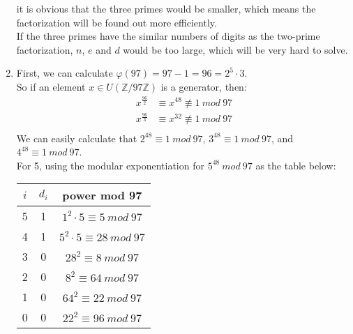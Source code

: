 \documentclass[12pt, a4paper]{article}
\begin{document}
\begin{enumerate}
          it is obvious that the three primes would be smaller, which means the factorization will be 
          found out more efficiently.\\
          If the three primes have the similar numbers of digits as the two-prime factorization, 
          $n$, $e$ and $d$ would be too large, which will be very hard to solve.
    \item First, we can calculate $\varphi(97) = 97 - 1 = 96 = 2^5\cdot 3$.\\
          So if an element $x \in U(\mathbb{Z}/97\mathbb{Z})$ is a generator, then:
          \begin{align*}
              x^{\frac{96}{2}} &\equiv x^{48} \not\equiv 1\ mod\ 97\\
              x^{\frac{96}{3}} &\equiv x^{32} \not\equiv 1\ mod\ 97\\
          \end{align*}
          We can easily calculate that $2^{48} \equiv 1\ mod\ 97$, $3^{48} \equiv 1\ mod\ 97$, 
          and $4^{48} \equiv 1\ mod\ 97$.\\
          For 5, using the modular exponentiation for $5^{48}\ mod\ 97$ as the table below:
          \begin{center}
              \begin{tabular}{c|c|c}
                  $i$ & $d_i$ & power mod 97\\
                  \hline
                  5 & 1 & $1^2\cdot 5 \equiv 5\ mod\ 97$\\
                  4 & 1 & $5^2\cdot 5 \equiv 28\ mod\ 97$\\
                  3 & 0 & $28^2 \equiv 8\ mod\ 97$\\
                  2 & 0 & $8^2 \equiv 64\ mod\ 97$\\
                  1 & 0 & $64^2 \equiv 22\ mod\ 97$\\
                  0 & 0 & $22^2 \equiv 96\ mod\ 97$
              \end{tabular}
          \end{center}
          

\end{enumerate}
\end{document}
